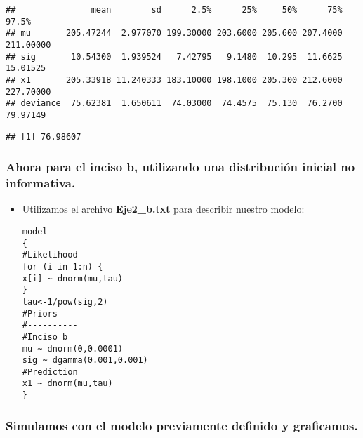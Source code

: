 \documentclass[]{article}
\newenvironment{Shaded}{\begin{snugshade}}{\end{snugshade}}
\newcommand{\KeywordTok}[1]{\textcolor[rgb]{0.13,0.29,0.53}{\textbf{{#1}}}}
\newcommand{\CommentTok}[1]{\textcolor[rgb]{0.56,0.35,0.01}{\textit{{#1}}}}
\newcommand{\NormalTok}[1]{{#1}}
\begin{document}
\begin{Shaded}
\end{Shaded}

\begin{verbatim}
##               mean        sd      2.5%      25%     50%      75%     97.5%
## mu       205.47244  2.977070 199.30000 203.6000 205.600 207.4000 211.00000
## sig       10.54300  1.939524   7.42795   9.1480  10.295  11.6625  15.01525
## x1       205.33918 11.240333 183.10000 198.1000 205.300 212.6000 227.70000
## deviance  75.62381  1.650611  74.03000  74.4575  75.130  76.2700  79.97149
\end{verbatim}

\begin{Shaded}
\end{Shaded}

\begin{verbatim}
## [1] 76.98607
\end{verbatim}

\subsubsection{Ahora para el inciso b, utilizando una distribución
inicial no
informativa.}\label{ahora-para-el-inciso-b-utilizando-una-distribucion-inicial-no-informativa.}

\begin{itemize}
\item
  Utilizamos el archivo \textbf{Eje2\_b.txt} para describir nuestro
  modelo:

\begin{verbatim}
model
{
#Likelihood
for (i in 1:n) {
x[i] ~ dnorm(mu,tau)
}
tau<-1/pow(sig,2)
#Priors 
#----------
#Inciso b
mu ~ dnorm(0,0.0001)
sig ~ dgamma(0.001,0.001)
#Prediction
x1 ~ dnorm(mu,tau)
}
\end{verbatim}
\end{itemize}

\subsubsection{Simulamos con el modelo previamente definido y
graficamos.}\label{simulamos-con-el-modelo-previamente-definido-y-graficamos.-1}
\end{document}

